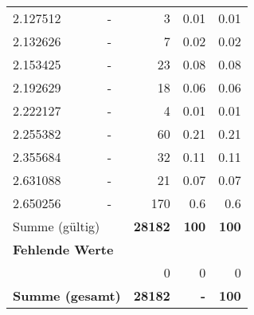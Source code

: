 \begin{longtable}{lXrrr}
        2.127512 & \multicolumn{1}{X}{-} & %
          \num{3} &
          \num[round-mode=places,round-precision=2]{0.01} &
          \num[round-mode=places,round-precision=2]{0.01} \\

        2.132626 & \multicolumn{1}{X}{-} & %
          \num{7} &
          \num[round-mode=places,round-precision=2]{0.02} &
          \num[round-mode=places,round-precision=2]{0.02} \\

        2.153425 & \multicolumn{1}{X}{-} & %
          \num{23} &
          \num[round-mode=places,round-precision=2]{0.08} &
          \num[round-mode=places,round-precision=2]{0.08} \\

        2.192629 & \multicolumn{1}{X}{-} & %
          \num{18} &
          \num[round-mode=places,round-precision=2]{0.06} &
          \num[round-mode=places,round-precision=2]{0.06} \\

        2.222127 & \multicolumn{1}{X}{-} & %
          \num{4} &
          \num[round-mode=places,round-precision=2]{0.01} &
          \num[round-mode=places,round-precision=2]{0.01} \\

        2.255382 & \multicolumn{1}{X}{-} & %
          \num{60} &
          \num[round-mode=places,round-precision=2]{0.21} &
          \num[round-mode=places,round-precision=2]{0.21} \\

        2.355684 & \multicolumn{1}{X}{-} & %
          \num{32} &
          \num[round-mode=places,round-precision=2]{0.11} &
          \num[round-mode=places,round-precision=2]{0.11} \\

        2.631088 & \multicolumn{1}{X}{-} & %
          \num{21} &
          \num[round-mode=places,round-precision=2]{0.07} &
          \num[round-mode=places,round-precision=2]{0.07} \\

        2.650256 & \multicolumn{1}{X}{-} & %
          \num{170} &
          \num[round-mode=places,round-precision=2]{0.6} &
          \num[round-mode=places,round-precision=2]{0.6} \\

     \midrule
     \multicolumn{2}{l}{Summe (gültig)} &
       \textbf{\num{28182}} &
     \textbf{100} &
       \textbf{\num[round-mode=places,round-precision=2]{100}} \\
     \multicolumn{5}{l}{\textbf{Fehlende Werte}}\\
      & & 0 & 0 & 0 \\
     \midrule
     \multicolumn{2}{l}{\textbf{Summe (gesamt)}} &
          \textbf{\num{28182}} &
        \textbf{-} &
        \textbf{100} \\
     \bottomrule
     \end{longtable}
     
